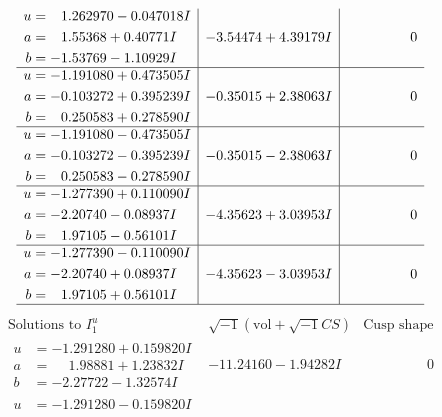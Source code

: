 \documentclass[1p]{elsarticle_modified}
\theoremstyle{definition}
\newcommand{\I}{\sqrt{-1}}
\begin{document}
$$\begin{array}{c|c|c}
\begin{aligned}
u &= \phantom{-}1.262970 - 0.047018 I \\
a &= \phantom{-}1.55368 + 0.40771 I \\
b &= -1.53769 - 1.10929 I\end{aligned}
 & -3.54474 + 4.39179 I & \phantom{-0.000000 } 0 \\ \hline\begin{aligned}
u &= -1.191080 + 0.473505 I \\
a &= -0.103272 + 0.395239 I \\
b &= \phantom{-}0.250583 + 0.278590 I\end{aligned}
 & -0.35015 + 2.38063 I & \phantom{-0.000000 } 0 \\ \hline\begin{aligned}
u &= -1.191080 - 0.473505 I \\
a &= -0.103272 - 0.395239 I \\
b &= \phantom{-}0.250583 - 0.278590 I\end{aligned}
 & -0.35015 - 2.38063 I & \phantom{-0.000000 } 0 \\ \hline\begin{aligned}
u &= -1.277390 + 0.110090 I \\
a &= -2.20740 - 0.08937 I \\
b &= \phantom{-}1.97105 - 0.56101 I\end{aligned}
 & -4.35623 + 3.03953 I & \phantom{-0.000000 } 0 \\ \hline\begin{aligned}
u &= -1.277390 - 0.110090 I \\
a &= -2.20740 + 0.08937 I \\
b &= \phantom{-}1.97105 + 0.56101 I\end{aligned}
 & -4.35623 - 3.03953 I & \phantom{-0.000000 } 0\\
 \hline 
 \end{array}$$\newpage$$\begin{array}{c|c|c}  
\text{Solutions to }I^u_{1}& \I (\text{vol} + \sqrt{-1}CS) & \text{Cusp shape}\\
 \hline 
\begin{aligned}
u &= -1.291280 + 0.159820 I \\
a &= \phantom{-}1.98881 + 1.23832 I \\
b &= -2.27722 - 1.32574 I\end{aligned}
 & -11.24160 - 1.94282 I & \phantom{-0.000000 } 0 \\ \hline\begin{aligned}
u &= -1.291280 - 0.159820 I \\

\end{aligned}
\end{array}$$
\end{document}
